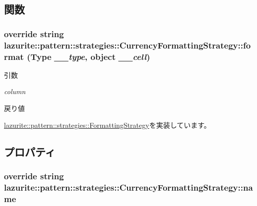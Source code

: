 \subsection{関数}
\hypertarget{classlazurite_1_1pattern_1_1strategies_1_1_currency_formatting_strategy_a72ff3e13e9da631c30822649a7ccea43}{
\subsubsection[{format}]{\setlength{\rightskip}{0pt plus 5cm}override string lazurite::pattern::strategies::CurrencyFormattingStrategy::format (Type {\em \_\-\_\-type}, \/  object {\em \_\-\_\-cell})}}
\label{classlazurite_1_1pattern_1_1strategies_1_1_currency_formatting_strategy_a72ff3e13e9da631c30822649a7ccea43}

\begin{DoxyParams}{引数}
\item[{\em column}]\end{DoxyParams}
\begin{DoxyReturn}{戻り値}

\end{DoxyReturn}


\hyperlink{classlazurite_1_1pattern_1_1strategies_1_1_formatting_strategy_a40cd8d7e44cef54b232ef86bc0492847}{lazurite::pattern::strategies::FormattingStrategy}を実装しています。

\subsection{プロパティ}
\hypertarget{classlazurite_1_1pattern_1_1strategies_1_1_currency_formatting_strategy_a507841259b13c733d09c2f747e81b8d5}{
\subsubsection[{name}]{\setlength{\rightskip}{0pt plus 5cm}override string lazurite::pattern::strategies::CurrencyFormattingStrategy::name}}
\label{classlazurite_1_1pattern_1_1strategies_1_1_currency_formatting_strategy_a507841259b13c733d09c2f747e81b8d5}


